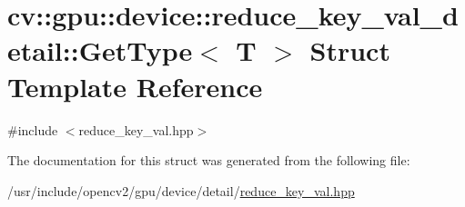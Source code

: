 \hypertarget{structcv_1_1gpu_1_1device_1_1reduce__key__val__detail_1_1GetType}{\section{cv\-:\-:gpu\-:\-:device\-:\-:reduce\-\_\-key\-\_\-val\-\_\-detail\-:\-:Get\-Type$<$ T $>$ Struct Template Reference}
\label{structcv_1_1gpu_1_1device_1_1reduce__key__val__detail_1_1GetType}
}


{\ttfamily \#include $<$reduce\-\_\-key\-\_\-val.\-hpp$>$}



The documentation for this struct was generated from the following file\-:\begin{DoxyCompactItemize}
\item 
/usr/include/opencv2/gpu/device/detail/\hyperlink{reduce__key__val_8hpp}{reduce\-\_\-key\-\_\-val.\-hpp}\end{DoxyCompactItemize}

